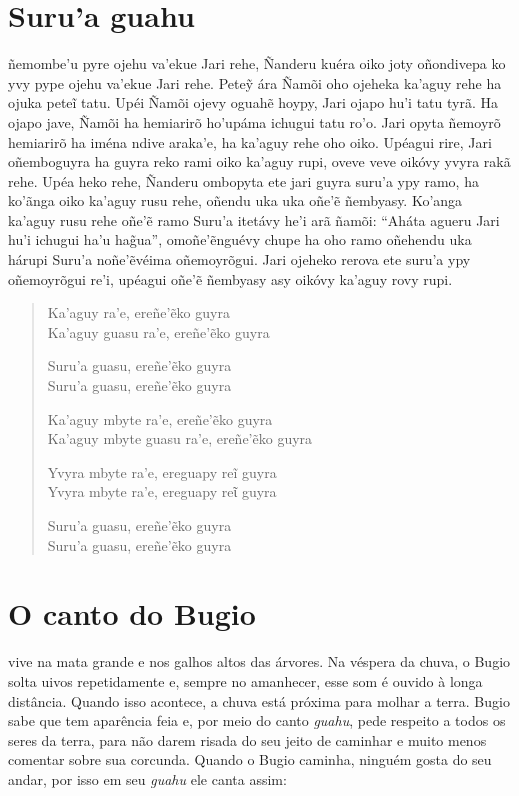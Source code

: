 \chapter{Suru'a guahu}

 ñemombe'u pyre ojehu va'ekue Jari rehe, Ñanderu kuéra oiko joty
oñondivepa ko yvy pype ojehu va'ekue Jari rehe. Peteỹ ára Ñamõi oho
ojeheka ka'aguy rehe ha ojuka peteĩ tatu. Upéi Ñamõi ojevy oguahẽ hoypy,
Jari ojapo hu'i tatu tyrã. Ha ojapo jave, Ñamõi ha hemiarirõ ho'upáma
ichugui tatu ro'o. Jari opyta ñemoyrõ hemiarirõ ha iména ndive araka'e,
ha ka'aguy rehe oho oiko. Upéagui rire, Jari oñemboguyra ha guyra reko
rami oiko ka'aguy rupi, oveve veve oikóvy yvyra rakã rehe. Upéa heko
rehe, Ñanderu ombopyta ete jari guyra suru'a ypy ramo, ha ko'ãnga oiko
ka'aguy rusu rehe, oñendu uka uka oñe'ẽ ñembyasy. Ko'anga ka'aguy rusu
rehe oñe'ẽ ramo Suru'a itetávy he'i arã ñamõi: ``Aháta agueru Jari hu'i
ichugui ha'u hag̃ua'', omoñe'ẽnguévy chupe ha oho ramo oñehendu uka
hárupi Suru'a noñe'ẽvéima oñemoyrõgui. Jari ojeheko rerova ete suru'a
ypy oñemoyrõgui re'i, upéagui oñe'ẽ ñembyasy asy oikóvy ka'aguy rovy
rupi.

\begin{verse}
Ka'aguy ra'e, ereñe'ẽko guyra\\
Ka'aguy guasu ra'e, ereñe'ẽko guyra
       
Suru'a guasu, ereñe'ẽko guyra\\
Suru'a guasu, ereñe'ẽko guyra
       
Ka'aguy mbyte ra'e, ereñe'ẽko guyra\\
Ka'aguy mbyte guasu ra'e, ereñe'ẽko guyra
       
Yvyra mbyte ra'e, ereguapy reĩ guyra\\ \EP[1]
Yvyra mbyte ra'e, ereguapy reῖ guyra
       
Suru'a guasu, ereñe'ẽko guyra\\
Suru'a guasu, ereñe'ẽko guyra
\end{verse}

\chapter{O canto do Bugio}

 vive na mata grande e nos galhos altos das árvores. Na véspera da
chuva, o Bugio solta uivos repetidamente e, sempre no amanhecer, esse
som é ouvido à longa distância. Quando isso acontece, a chuva está
próxima para molhar a terra. Bugio sabe que tem aparência feia e, por
meio do canto \textit{guahu}, pede respeito a todos os seres da terra,
para não darem risada do seu jeito de caminhar e muito menos comentar
sobre sua corcunda. Quando o Bugio caminha, ninguém gosta do seu andar,
por isso em seu \textit{guahu} ele canta assim:

